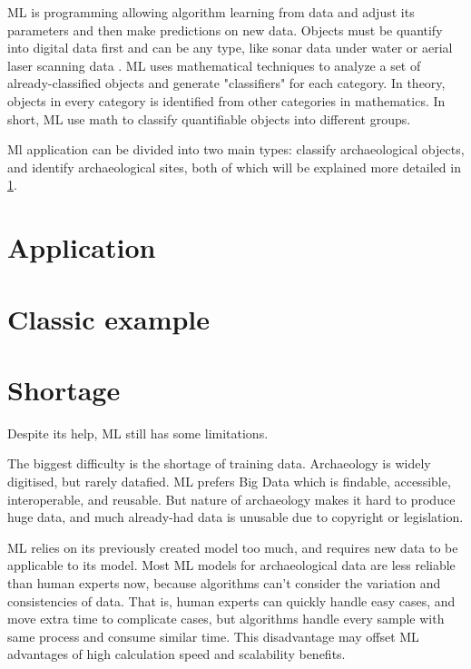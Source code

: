 \documentclass[journal]{IEEEtran}
\begin{document}
	ML is programming allowing algorithm learning from data and adjust its parameters and then make predictions on new data. Objects must be quantify into digital data first and can be any type, like sonar data under water\cite{Drap2018UnderwaterPF} or aerial
	laser scanning data \cite{rs10020225}. ML uses mathematical techniques to analyze a set of already-classified objects and generate "classifiers" for each category. In theory, objects in every category is identified from other categories in mathematics. In short, ML use math to classify quantifiable objects into different groups.\cite{bickler_2021}
	
	Ml application can be divided into two main types: classify archaeological objects, and identify archaeological sites, both of which will be explained more detailed in \ref{application}.

	
	
	\section{Application}\label{application}
	
	\section{Classic example}\label{example}
	
	\section{Shortage}
	
	Despite its help, ML still has some limitations.
	
	The biggest difficulty is the shortage of training data. Archaeology is widely digitised, but rarely datafied\cite{Anichini2018BigAD}. ML prefers Big Data which is findable, accessible, interoperable, and reusable. But nature of archaeology makes it hard to produce huge data, and much already-had data is unusable due to copyright or legislation.\cite{heritage4010008}
	
	ML relies on its previously created model too much, and requires new data to be applicable to its model. Most ML models for archaeological data are less reliable than human experts now, because algorithms can't consider the variation and consistencies of data. That is, human experts can quickly handle easy cases, and move extra time to complicate cases, but algorithms handle every sample with same process and consume similar time. This disadvantage may offset ML advantages of high calculation speed and scalability benefits.\cite{bickler_2021}
	
\end{document}
